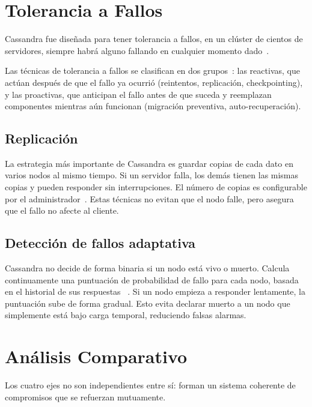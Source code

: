 \documentclass[12pt, a4paper]{article}
\begin{document}
\section{Tolerancia a Fallos}

Cassandra fue diseñada para tener tolerancia a fallos, en un clúster de
cientos de servidores, siempre habrá alguno fallando en cualquier
momento dado~\cite{lakshman2010}.

Las técnicas de tolerancia a fallos se clasifican
en dos grupos~\cite{ledmi2018}: las reactivas, que actúan
después de que el fallo ya ocurrió (reintentos, replicación,
checkpointing), y las proactivas, que anticipan el fallo antes
de que suceda y reemplazan componentes mientras aún funcionan
(migración preventiva, auto-recuperación).

\subsection{Replicación}

La estrategia más importante de Cassandra es guardar copias de cada
dato en varios nodos al mismo tiempo. Si un servidor falla, los demás
tienen las mismas copias y pueden responder sin interrupciones.
El número de copias es configurable por el administrador~\cite{lakshman2010}.
Estas técnicas no evitan que el nodo falle,
pero asegura que el fallo no afecte al cliente.


\subsection{Detección de fallos adaptativa}

Cassandra no decide de forma binaria si un nodo está vivo o muerto.
Calcula continuamente una puntuación de probabilidad de fallo para
cada nodo, basada en el historial de sus respuestas ~\cite{lakshman2010}. Si un nodo empieza
a responder lentamente, la puntuación sube de forma gradual. Esto
evita declarar muerto a un nodo que simplemente está bajo carga
temporal, reduciendo falsas alarmas.

\section{Análisis Comparativo}

Los cuatro ejes no son independientes entre sí: forman un
sistema coherente de compromisos que se refuerzan mutuamente.
\end{document}
